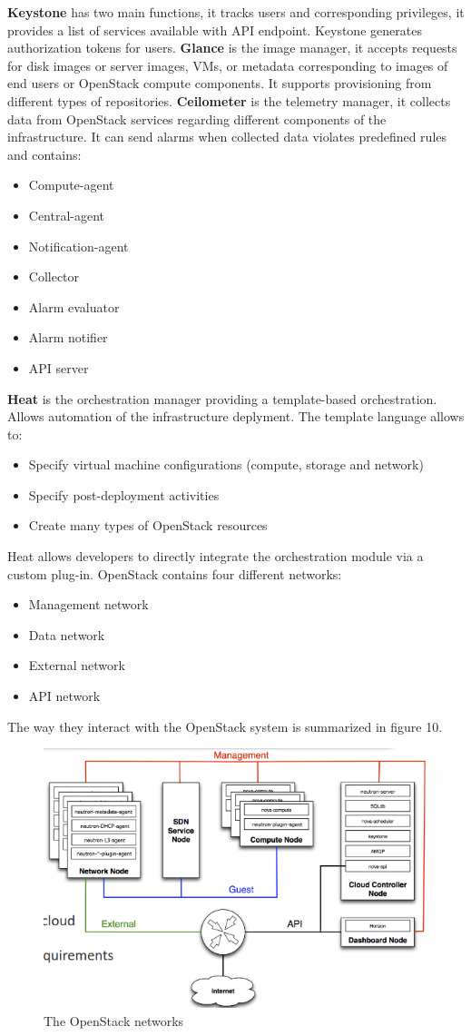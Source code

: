 \textbf{Keystone} has two main functions, it tracks users and corresponding privileges, it provides a list of services available with API endpoint. Keystone generates authorization tokens for users.
\textbf{Glance} is the image manager, it accepts requests for disk images or server images, VMs, or metadata corresponding to images of end users or OpenStack compute components. \n
It supports provisioning from different types of repositories. \n
\textbf{Ceilometer} is the telemetry manager, it collects data from OpenStack services regarding different components of the infrastructure. It can send alarms when collected data violates predefined rules and contains:
\begin{itemize}
    \item Compute-agent
    \item Central-agent
    \item Notification-agent
    \item Collector
    \item Alarm evaluator
    \item Alarm notifier
    \item API server
\end{itemize}
\textbf{Heat} is the orchestration manager providing a template-based orchestration. Allows automation of the infrastructure deplyment. The template language allows to:
\begin{itemize}
    \item Specify virtual machine configurations (compute, storage and network)
    \item Specify post-deployment activities
    \item Create many types of OpenStack resources
\end{itemize}
Heat allows developers to directly integrate the orchestration module via a custom plug-in. \n
OpenStack contains four different networks:
\begin{itemize}
    \item Management network
    \item Data network
    \item External network
    \item API network
\end{itemize}
The way they interact with the OpenStack system is summarized in figure 10.
\begin{figure}
    \centering
    \includegraphics[scale=0.5]{Images/OpenStack_network.png}
    \caption{The OpenStack networks}
\end{figure}
